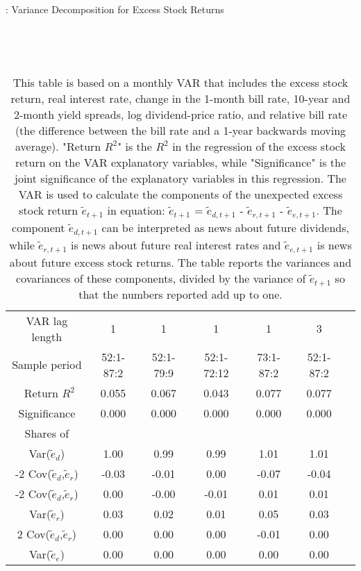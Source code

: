 \documentclass[11pt]{article}
\begin{document}
\begin{table}[H]
\centering
\caption {: Variance Decomposition for Excess Stock Returns} \label{tab:table2} \\
\caption*{This table is based on a monthly VAR that includes the excess stock return, real interest rate, change in the 1-month bill rate, 10-year and 2-month yield spreads, log dividend-price ratio, and relative bill rate (the difference between the bill rate and a 1-year backwards moving average). "Return $R^2$" is the $R^2$ in the regression of the excess stock return on the VAR explanatory variables, while "Significance" is the joint significance of the explanatory variables in this regression. The VAR is used to calculate the components of the unexpected excess stock return $\tilde{e}_{t+1}$ in equation: $\tilde{e}_{t+1}$ = $\tilde{e}_{d,t+1}$ - $\tilde{e}_{r,t+1}$ - $\tilde{e}_{e,t+1}$. The component $\tilde{e}_{d,t+1}$ can be interpreted as news about future dividends, while $\tilde{e}_{r,t+1}$ is news about future real interest rates and $\tilde{e}_{e,t+1}$ is news about future excess stock returns. The table reports the variances and covariances of these components, divided by the variance of $\tilde{e}_{t+1}$ so that the numbers reported add up to one.}\\ 
\begin{tabular}{ccccccc}
  \hline
VAR lag length & 1 & 1 & 1 & 1 & 3 \\ 
Sample period & 52:1-87:2 & 52:1-79:9 & 52:1-72:12 & 73:1-87:2 & 52:1-87:2 \\ 
  \hline\
Return $R^2$ & 0.055 & 0.067 & 0.043 & 0.077 & 0.077 \\ 
Significance & 0.000 & 0.000 & 0.000 & 0.000 & 0.000 \\ 
  \hline
Shares of & & & & & &\\
  Var($\tilde{e}_d$) & 1.00 & 0.99 & 0.99 & 1.01 & 1.01 \\ 
  -2 Cov($\tilde{e}_d$,$\tilde{e}_r$) & -0.03 & -0.01 & 0.00 & -0.07 & -0.04 \\ 
  -2 Cov($\tilde{e}_d$,$\tilde{e}_r$) & 0.00 & -0.00 & -0.01 & 0.01 & 0.01 \\ 
  Var($\tilde{e}_r$) & 0.03 & 0.02 & 0.01 & 0.05 & 0.03 \\ 
  2 Cov($\tilde{e}_d$,$\tilde{e}_r$) & 0.00 & 0.00 & 0.00 & -0.01 & 0.00 \\ 
  Var($\tilde{e}_e$) & 0.00 & 0.00 & 0.00 & 0.00 & 0.00 \\ 
   \hline
\end{tabular}
\end{table}
\end{document}
